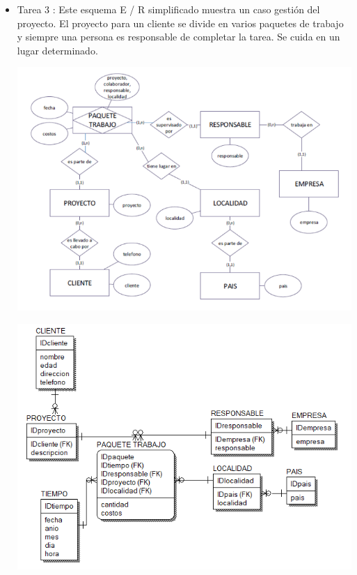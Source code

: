 \begin{itemize}
\item Tarea 3 :
Este esquema E / R simplificado muestra un caso gestión del proyecto.
El proyecto para un cliente se divide en varios paquetes de trabajo y siempre una persona es responsable de completar la
tarea. Se cuida en un lugar determinado.

\begin{center}
\includegraphics[width=14cm]{./Imagenes/tarea3.png}
\end{center}
\begin{center}
\includegraphics[width=14cm]{./Imagenes/tarea33.png}
\end{center}


\end{itemize}







